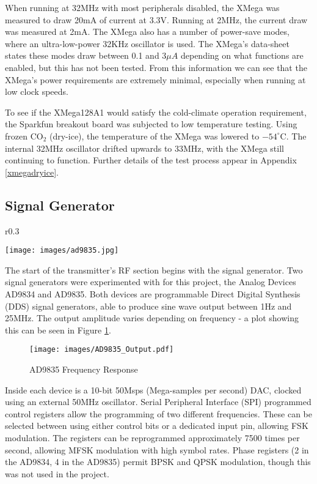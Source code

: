 \documentclass[a4paper,12pt]{article}
\begin{document}
When running at 32MHz with most peripherals disabled, the XMega was measured to draw 20mA of current at 3.3V. Running at 2MHz, the current draw was measured at 2mA. The XMega also has a number of power-save modes, where an ultra-low-power 32KHz oscillator is used. The XMega's data-sheet states these modes draw between 0.1 and $3\mu A$ depending on what functions are enabled, but this has not been tested. From this information we can see that the XMega's power requirements are extremely minimal, especially when running at low clock speeds.

To see if the XMega128A1 would satisfy the cold-climate operation requirement, the Sparkfun breakout board was subjected to low temperature testing. Using frozen CO$_2$ (dry-ice), the temperature of the XMega was lowered to $-54^\circ$C. The internal 32MHz oscillator drifted upwards to 33MHz, with the XMega still continuing to function. Further details of the test process appear in  Appendix \ref{xmegadryice}.


\subsection{Signal Generator}
\begin{wrapfigure}{r}{0.3\textwidth}
  \begin{center}
    \texttt{[image: images/ad9835.jpg]}
  \end{center}
  \caption{AD9835 Breakout}
  \label{fig:ad9835}
\end{wrapfigure}
The start of the transmitter's RF section begins with the signal generator. Two signal generators were experimented with for this project, the Analog Devices AD9834 and AD9835. Both devices are programmable Direct Digital Synthesis (DDS) signal generators, able to produce sine wave output between 1Hz and 25MHz. The output amplitude varies depending on frequency - a plot showing this can be seen in Figure \ref{fig:ad9835_output}.

\begin{figure}%
  \begin{center}
    \texttt{[image: images/AD9835\_Output.pdf]}
  \end{center}
  \caption{AD9835 Frequency Response}
  \label{fig:ad9835_output}
\end{figure}

Inside each device is a 10-bit 50Msps (Mega-samples per second) DAC, clocked using an external 50MHz oscillator. Serial Peripheral Interface (SPI) programmed control registers allow the programming of two different frequencies. These can be selected between using either control bits or a dedicated input pin, allowing FSK modulation. The registers can be reprogrammed approximately 7500 times per second, allowing MFSK modulation with high symbol rates. Phase registers (2 in the AD9834, 4 in the AD9835) permit BPSK and QPSK modulation, though this was not used in the project.
\end{document}
